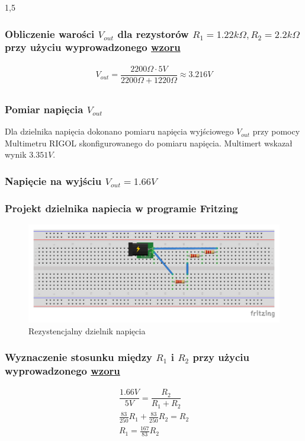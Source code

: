 \documentclass[polish,polish,a4paper]{article}
\begin{document}
\begin{spacing}{1,5}
		\subsubsection*{Obliczenie warości $ V_{out}$ dla rezystorów $ R_{1} = 1.22k\Omega, R_{2} =2.2k\Omega  $  przy użyciu wyprowadzonego \hyperref[eq:vout]{wzoru}}
		\begin{gather*}
		V_{out} = \dfrac{2200\Omega \cdot 5V}{2200\Omega + 1220\Omega} \approx 3.216V\\
		\end{gather*}
		\subsubsection*{Pomiar napięcia $ V_{out} $}
		Dla dzielnika napięcia dokonano pomiaru napięcia wyjściowego $ V_{out} $ przy pomocy Multimetru RIGOL skonfigurowanego do pomiaru napięcia. Multimert wskazał wynik $3.351V$.
		
		
		
		
		\subsubsection{Napięcie na wyjściu $V_{out} =  1.66V $}
		
		\subsubsection*{Projekt dzielnika napiecia w programie Fritzing}
		
		\begin{figure}[H]
			\centering
			\includegraphics[scale=0.9]{1_66_bb.pdf}
			\caption{Rezystencjalny dzielnik napięcia}
			\label{fig:pod1_66}
		\end{figure}
		
		\subsubsection*{Wyznaczenie stosunku między $ R_{1} $ i $ R_{2} $ przy użyciu wyprowadzonego \hyperref[eq:vout]{wzoru}}
		\begin{gather*}
		\dfrac{1.66V}{5V} = \dfrac{R_{2}}{R_{1} + R_{2}}\\
		\frac{83}{250} R_{1} + \frac{83}{250}R_{2} = R_{2}\\
		R_{1} =\frac{167}{83} R_{2}\\
		\end{gather*}

\end{spacing}
\end{document}
